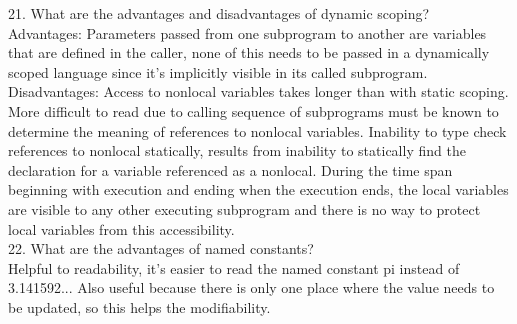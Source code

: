 \documentclass{article}
\begin{document}
21. What are the advantages and disadvantages of dynamic scoping?\\
Advantages: Parameters passed from one subprogram to another are variables that are defined in the caller, none of this needs to be passed in a dynamically scoped language since it's implicitly visible in its called subprogram.\\
Disadvantages: Access to nonlocal variables takes longer than with static scoping. More difficult to read due to calling sequence of subprograms must be known to determine the meaning of references to nonlocal variables. Inability to type check references to nonlocal statically, results from inability to statically find the declaration for a variable referenced as a nonlocal. During the time span beginning with execution and ending when the execution ends, the local variables are visible to any other executing subprogram and there is no way to protect local variables from this accessibility.\\
22. What are the advantages of named constants?\\
Helpful to readability, it's easier to read the named constant pi instead of 3.141592... Also useful because there is only one place where the value needs to be updated, so this helps the modifiability.
\end{document}
